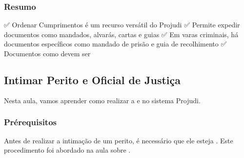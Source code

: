 \documentclass[letterpaper,10pt,brazil]{sphinxmanual}
\begin{document}
\subsubsection{Resumo}
\label{\detokenize{projud_33_ordenarcumprimento:resumo}}
\sphinxAtStartPar
✅ Ordenar Cumprimentos é um recurso versátil do Projudi
✅ Permite expedir documentos como mandados, alvarás, cartas e guias
✅ Em varas criminais, há documentos específicos como mandado de prisão e guia de recolhimento
✅ Documentos como  devem ser 

\sphinxstepscope


\subsection{Intimar Perito e Oficial de Justiça}
\label{\detokenize{projud_34_intimarperitooj:intimar-perito-e-oficial-de-justica}}\label{\detokenize{projud_34_intimarperitooj::doc}}
\sphinxAtStartPar
Nesta aula, vamos aprender como realizar a  e  no sistema Projudi.


\subsubsection{Pré\sphinxhyphen{}requisitos}
\label{\detokenize{projud_34_intimarperitooj:pre-requisitos}}
\sphinxAtStartPar
Antes de realizar a intimação de um perito, é necessário que ele esteja . Este procedimento foi abordado na aula sobre .
\end{document}
